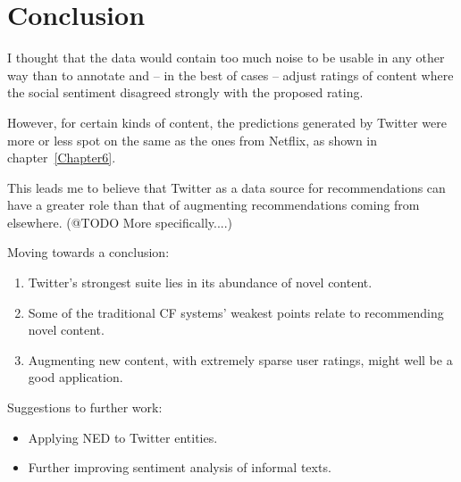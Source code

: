 
\chapter{Conclusion} %

\label{Chapter7}




I thought that the data would contain too much noise to be usable in any other way than to annotate and -- in the best of cases -- adjust ratings of content where the social sentiment disagreed strongly with the proposed rating.

However, for certain kinds of content, the predictions generated by Twitter were more or less spot on the same as the ones from Netflix, as shown in chapter~\ref{Chapter6}.

This leads me to believe that Twitter as a data source for recommendations can have a greater role than that of augmenting recommendations coming from elsewhere. (@TODO More specifically....)

Moving towards a conclusion:

\begin{enumerate}
  \item Twitter's strongest suite lies in its abundance of novel content.
  \item Some of the traditional CF systems' weakest points relate to recommending novel content.
  \item Augmenting new content, with extremely sparse user ratings, might well be a good application.
\end{enumerate}

Suggestions to further work:

\begin{itemize}
  \item Applying NED to Twitter entities.
  \item Further improving sentiment analysis of informal texts.
\end{itemize}
